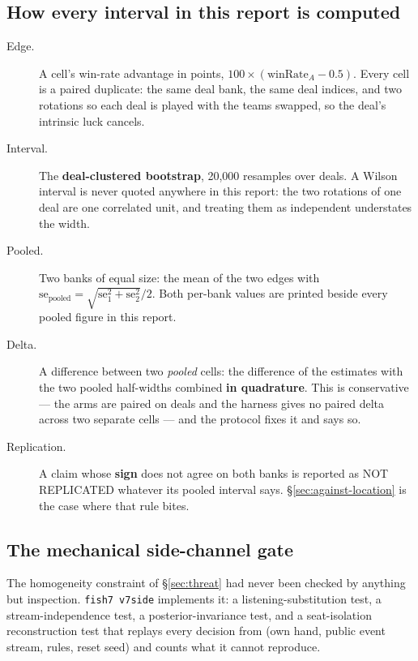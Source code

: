 \subsection{How every interval in this report is computed}
\label{sec:instrument-arithmetic}

\begin{description}
\item[Edge.] A cell's win-rate advantage in points, $100 \times (\text{winRate}_A - 0.5)$. Every cell
  is a paired duplicate: the same deal bank, the same deal indices, and two rotations so each deal is
  played with the teams swapped, so the deal's intrinsic luck cancels.
\item[Interval.] The \textbf{deal-clustered bootstrap}, 20{,}000 resamples over deals. A Wilson
  interval is never quoted anywhere in this report: the two rotations of one deal are one correlated
  unit, and treating them as independent understates the width.
\item[Pooled.] Two banks of equal size: the mean of the two edges with
  $\text{se}_{\text{pooled}} = \sqrt{\text{se}_1^2 + \text{se}_2^2}/2$. Both per-bank values are
  printed beside every pooled figure in this report.
\item[Delta.] A difference between two \emph{pooled} cells: the difference of the estimates with the
  two pooled half-widths combined \textbf{in quadrature}. This is conservative --- the arms are paired
  on deals and the harness gives no paired delta across two separate cells --- and the protocol fixes
  it and says so.
\item[Replication.] A claim whose \textbf{sign} does not agree on both banks is reported as NOT
  REPLICATED whatever its pooled interval says. \S\ref{sec:against-location} is the case where that
  rule bites.
\end{description}

\subsection{The mechanical side-channel gate}
\label{sec:instrument-side}

The homogeneity constraint of \S\ref{sec:threat} had never been checked by anything but inspection.
\texttt{fish7 v7side} implements it: a listening-substitution test, a stream-independence test, a
posterior-invariance test, and a seat-isolation reconstruction test that replays every decision from
(own hand, public event stream, rules, reset seed) and counts what it cannot reproduce.

